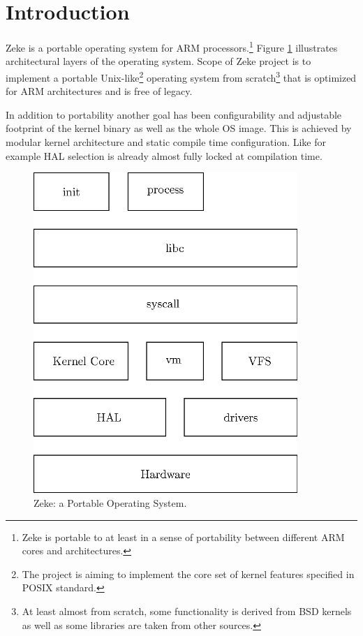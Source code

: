 \part{Introduction}

Zeke is a portable operating system for ARM processors.\footnote{Zeke is
portable to at least in a sense of portability between different ARM cores
and architectures.} Figure \ref{figure:zeke} illustrates architectural layers
of the operating system. Scope of Zeke project is to implement a portable
Unix-like\footnote{The project is aiming to implement the core set of kernel
features specified in \ac{POSIX} standard.} operating system from
scratch\footnote{At least almost from scratch, some functionality is derived
from BSD kernels as well as some libraries are taken from other sources.} that
is optimized for ARM architectures and is free of legacy.

In addition to portability another goal has been configurability and adjustable
footprint of the kernel binary as well as the whole OS image. This is achieved
by modular kernel architecture and static compile time configuration. Like for
example \ac{HAL} selection is already almost fully locked at compilation time.

\begin{figure}
  \includegraphics[width=10cm]{pics/zeke}
  \centering
  \caption{Zeke: a Portable Operating System.}
  \label{figure:zeke}
\end{figure}


